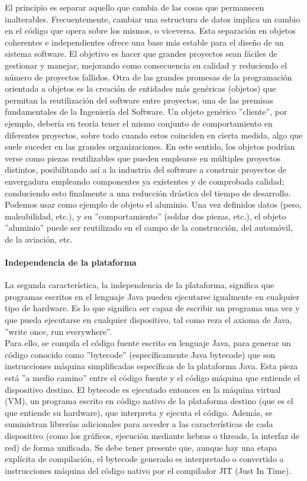 \begin{description}
El principio es separar aquello que cambia de las cosas que permanecen inalterables. Frecuentemente, cambiar una estructura de datos implica un cambio en el c\'odigo que opera sobre los mismos, o viceversa. Esta separaci\'on en objetos coherentes e independientes ofrece una base m\'as estable para el dise\~no de un sistema software. El objetivo es hacer que grandes proyectos sean f\'aciles de gestionar y manejar, mejorando como consecuencia su calidad y reduciendo el n\'umero de proyectos fallidos. Otra de las grandes promesas de la programaci\'on orientada a objetos es la creaci\'on de entidades m\'as gen\'ericas (objetos) que permitan la reutilizaci\'on del software entre proyectos, una de las premisas fundamentales de la Ingenier\'ia del Software. Un objeto gen\'erico ''cliente'', por ejemplo, deber\'ia en teor\'ia tener el mismo conjunto de comportamiento en diferentes proyectos, sobre todo cuando estos coinciden en cierta medida, algo que suele suceder en las grandes organizaciones. En este sentido, los objetos podr\'ian verse como piezas reutilizables que pueden emplearse en m\'ultiples proyectos distintos, posibilitando as\'i a la industria del software a construir proyectos de envergadura empleando componentes ya existentes y de comprobada calidad; conduciendo esto finalmente a una reducci\'on dr\'astica del tiempo de desarrollo. Podemos usar como ejemplo de objeto el aluminio. Una vez definidos datos (peso, maleabilidad, etc.), y su ''comportamiento'' (soldar dos piezas, etc.), el objeto ''aluminio'' puede ser reutilizado en el campo de la construcci\'on, del autom\'ovil, de la aviaci\'on, etc.

\paragraph{Independencia de la plataforma}
La segunda caracter\'istica, la independencia de la plataforma, significa que programas escritos en el lenguaje Java pueden ejecutarse igualmente en cualquier tipo de hardware. Es lo que significa ser capaz de escribir un programa una vez y que pueda ejecutarse en cualquier dispositivo, tal como reza el axioma de Java, ''write once, run everywhere''.\\

Para ello, se compila el c\'odigo fuente escrito en lenguaje Java, para generar un c\'odigo conocido como ''bytecode'' (espec\'ificamente Java bytecode) que son instrucciones m\'aquina simplificadas espec\'ificas de la plataforma Java. Esta pieza est\'a ''a medio camino'' entre el c\'odigo fuente y el c\'odigo m\'aquina que entiende el dispositivo destino. El bytecode es ejecutado entonces en la m\'aquina virtual (VM), un programa escrito en c\'odigo nativo de la plataforma destino (que es el que entiende su hardware), que interpreta y ejecuta el c\'odigo. Adem\'as, se suministran librer\'ias adicionales para acceder a las caracter\'isticas de cada dispositivo (como los gr\'aficos, ejecuci\'on mediante hebras o threads, la interfaz de red) de forma unificada. Se debe tener presente que, aunque hay una etapa expl\'icita de compilaci\'on, el bytecode generado es interpretado o convertido a instrucciones m\'aquina del c\'odigo nativo por el compilador JIT (Just In Time).


\end{description}
